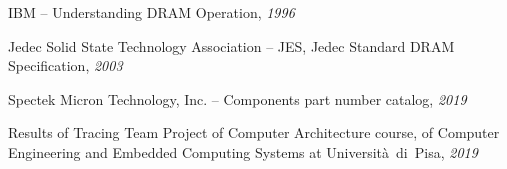 \documentclass[a4paper,12pt]{article}
\begin{document}
\clearpage

\begin{thebibliography}{0}
IBM -- Understanding DRAM Operation, \textit{1996}

Jedec Solid State Technology Association -- JES, Jedec Standard DRAM Specification, \textit{2003}

Spectek Micron Technology, Inc. -- Components part number catalog, \textit{2019}

Results of Tracing Team Project of Computer Architecture course, of Computer Engineering and Embedded Computing Systems at Università~di~Pisa, \textit{2019}

\end{thebibliography}
\end{document}
